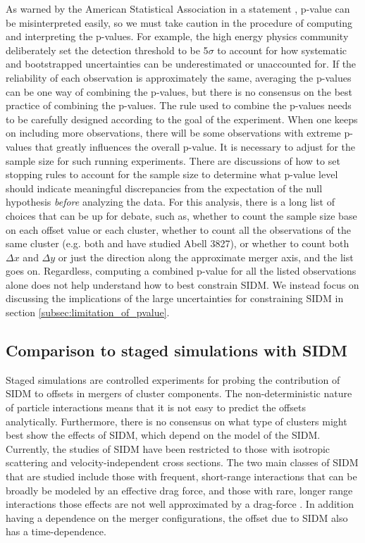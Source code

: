 As warned by the American Statistical Association in a statement \citep{Wasserstein2016},
p-value can be misinterpreted easily, so
we must take caution in the procedure of computing and interpreting the p-values. 
For example, the high energy physics community deliberately set the detection
threshold to be 5$\sigma$ to account for how systematic and bootstrapped 
uncertainties can be
underestimated or unaccounted for. 
If the reliability of each observation is 
approximately the same, averaging the p-values can be one way of combining the p-values, 
but there is no consensus on the best practice of combining the
p-values. The rule used to combine the p-values 
needs to be carefully designed according to the goal of the experiment.
When one keeps on including more observations,  
there will be some observations with extreme p-values that greatly influences the
overall p-value. It is necessary to adjust for the sample size for such running
experiments.   
There are discussions of how to set stopping rules \citep{Demortier2007}
to account for the sample size to determine what p-value level should indicate meaningful
discrepancies from the expectation of the null hypothesis {\it before}
analyzing the data. 
For this analysis, there is a long list of choices that can be up for debate, 
such as, whether to count the sample 
size base on each offset value or each cluster, whether to count all the
observations of the same cluster (e.g. both \citealt{Williams2011a} and
\citealt{Massey2015} have studied Abell 3827), or whether to count both $\Delta x$
and $\Delta y$ or just the direction along the approximate merger axis, and the
list goes on.
Regardless, computing a combined p-value for all the listed observations alone 
does not help understand how to best constrain SIDM.
We instead focus on discussing the implications of the large uncertainties for
constraining SIDM in section \ref{subsec:limitation_of_pvalue}. 

\subsection{Comparison to staged simulations with SIDM}
\label{subsec:SIDM_sim}
Staged simulations are controlled experiments for probing the contribution
of SIDM to offsets in mergers of cluster components. 
The non-deterministic nature of particle interactions means that it is not easy
to predict the offsets analytically.
Furthermore, there is no consensus on what type of clusters might best show the
effects of SIDM, which depend on the model of the SIDM.
Currently, the studies of SIDM have been restricted to those with isotropic
scattering and velocity-independent cross sections.   
The two main classes of SIDM that are studied include those with 
frequent, short-range interactions that can be broadly be modeled by an
effective drag force, and those with rare, longer range interactions those
effects are not well approximated by a drag-force \citep{Kahlhoefer14}. 
In addition having a dependence on the merger configurations, the offset due to
SIDM also has a time-dependence.    

